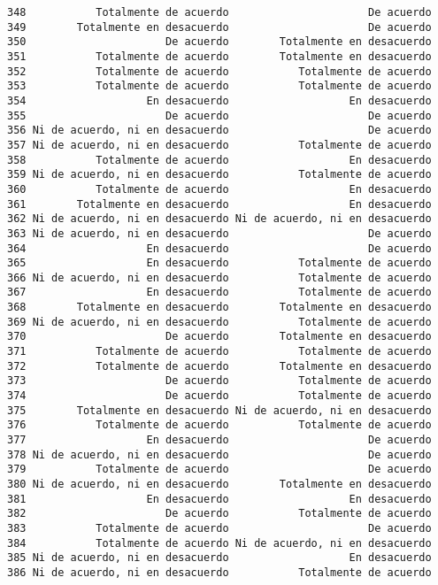 \documentclass[
  letterpaper,
  DIV=11,
  numbers=noendperiod]{scrartcl}
\begin{document}
\begin{verbatim}
348           Totalmente de acuerdo                      De acuerdo
349        Totalmente en desacuerdo                      De acuerdo
350                      De acuerdo        Totalmente en desacuerdo
351           Totalmente de acuerdo        Totalmente en desacuerdo
352           Totalmente de acuerdo           Totalmente de acuerdo
353           Totalmente de acuerdo           Totalmente de acuerdo
354                   En desacuerdo                   En desacuerdo
355                      De acuerdo                      De acuerdo
356 Ni de acuerdo, ni en desacuerdo                      De acuerdo
357 Ni de acuerdo, ni en desacuerdo           Totalmente de acuerdo
358           Totalmente de acuerdo                   En desacuerdo
359 Ni de acuerdo, ni en desacuerdo           Totalmente de acuerdo
360           Totalmente de acuerdo                   En desacuerdo
361        Totalmente en desacuerdo                   En desacuerdo
362 Ni de acuerdo, ni en desacuerdo Ni de acuerdo, ni en desacuerdo
363 Ni de acuerdo, ni en desacuerdo                      De acuerdo
364                   En desacuerdo                      De acuerdo
365                   En desacuerdo           Totalmente de acuerdo
366 Ni de acuerdo, ni en desacuerdo           Totalmente de acuerdo
367                   En desacuerdo           Totalmente de acuerdo
368        Totalmente en desacuerdo        Totalmente en desacuerdo
369 Ni de acuerdo, ni en desacuerdo           Totalmente de acuerdo
370                      De acuerdo        Totalmente en desacuerdo
371           Totalmente de acuerdo           Totalmente de acuerdo
372           Totalmente de acuerdo        Totalmente en desacuerdo
373                      De acuerdo           Totalmente de acuerdo
374                      De acuerdo           Totalmente de acuerdo
375        Totalmente en desacuerdo Ni de acuerdo, ni en desacuerdo
376           Totalmente de acuerdo           Totalmente de acuerdo
377                   En desacuerdo                      De acuerdo
378 Ni de acuerdo, ni en desacuerdo                      De acuerdo
379           Totalmente de acuerdo                      De acuerdo
380 Ni de acuerdo, ni en desacuerdo        Totalmente en desacuerdo
381                   En desacuerdo                   En desacuerdo
382                      De acuerdo           Totalmente de acuerdo
383           Totalmente de acuerdo                      De acuerdo
384           Totalmente de acuerdo Ni de acuerdo, ni en desacuerdo
385 Ni de acuerdo, ni en desacuerdo                   En desacuerdo
386 Ni de acuerdo, ni en desacuerdo           Totalmente de acuerdo

\end{verbatim}
\end{document}
